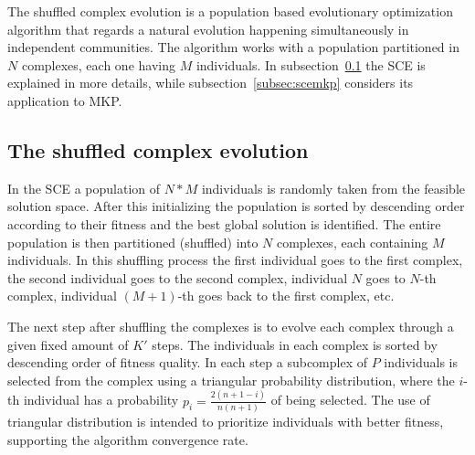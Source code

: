 

The shuffled complex evolution is a population
based evolutionary optimization algorithm that regards a natural 
evolution happening simultaneously in independent communities.
The algorithm works with a population partitioned in $N$ complexes, each one
having $M$ individuals.
In subsection~\ref{subsec:sce} the SCE is explained in more details,
while subsection~\ref{subsec:scemkp} considers its application to MKP.


\subsection{The shuffled complex evolution}
\label{subsec:sce}
In the SCE a population of $N*M$ individuals is randomly taken from the
feasible solution space.
After this initializing the population is sorted by descending order according
to their fitness and the best global solution is identified.
The entire population is then partitioned (shuffled) into $N$ complexes,
each containing $M$ individuals.
In this shuffling process the first individual goes to the first complex, the second
individual goes to the second complex, individual $N$ goes to $N$-th complex,
individual $(M+1)$-th goes back to the first complex, etc.

The next step after shuffling the complexes is to evolve each complex through
a given fixed amount of $K'$ steps.
The individuals in each complex is sorted by descending order of fitness quality.
In each step a subcomplex of $P$ individuals is selected from the
complex using a triangular probability distribution, where the $i$-th individual
has a probability $p_i = \frac{2(n+1-i)}{n(n+1)}$ of being selected.
The use of triangular distribution is intended to prioritize individuals with
better fitness, supporting the algorithm convergence rate.

